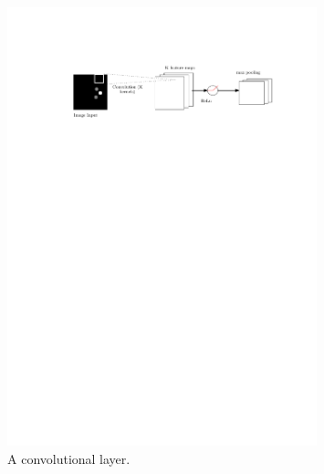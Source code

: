 \documentclass[a4paper,11pt]{report}
\begin{document}
	\begin{figure}
	\centering
	    \includegraphics[width=0.8\textwidth]{figures/conv_layer.pdf}
	  \caption[Conv layer]{A convolutional layer.}
	  \label{fig:conv_layer}
	\end{figure}
\end{document}
